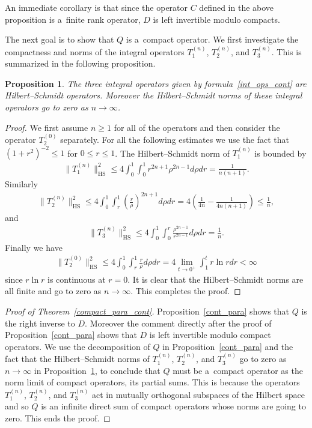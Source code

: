 \documentclass[pdftex]{sigma}
\numberwithin{equation}{section}
\newtheorem{prop}[theo]{Proposition}
{\theoremstyle{definition}
\newtheorem{rem}[theo]{Remark}
\newtheorem{defin}[theo]{Definition}
}
\begin{document}
An immediate corollary is that since the operator $C$ def\/ined in the above proposition is a~f\/inite rank operator, $D$ is
left invertible modulo compacts.

The next goal is to show that $Q$ is a~compact operator.
We f\/irst investigate the compactness and norms of the integral operators $T_1^{(n)}$, $T_2^{(n)}$, and $T_3^{(n)}$.
This is summarized in the following proposition.

\begin{prop}
\label{hs_norm_cont_T}
The three integral operators given by formula~\eqref{int_ops_cont} are Hilbert--Schmidt ope\-rators.
Moreover the Hilbert--Schmidt norms of these integral operators go to zero as $n\to\infty$.
\end{prop}

\begin{proof}
We f\/irst assume $n\ge1$ for all of the operators and then consider the operator $T_2^{(0)}$ separately.
For all the following estimates we use the fact that $(1+r^2)^{-2} \le 1$ for $0\le r\le 1$.
The Hilbert--Schmidt norm of $T_1^{(n)}$ is bounded by
\begin{gather*}
\|T_1^{(n)}\|_{\textrm{HS}}^2 \le 4\int_0^1\int_0^1r^{2n+1}\rho^{2n-1}d\rho dr =\frac{1}{n(n+1)}.
\end{gather*}
Similarly
\begin{gather*}
\|T_2^{(n)}\|_{\textrm{HS}}^2 \le 4\int_0^1\int_r^1 \left(\frac{r}{\rho}\right)^{2n+1}d\rho dr=4\left(\frac{1}{4n}-
\frac{1}{4n(n+1)}\right) \le \frac{1}{n},
\end{gather*}
and
\begin{gather*}
\|T_3^{(n)}\|_{\textrm{HS}}^2 \le 4\int_0^1\int_0^r \frac{\rho^{2n-1}}{r^{2n-1}}d\rho dr = \frac{1}{n}.
\end{gather*}
Finally we have
\begin{gather*}
\big\|T_2^{(0)}\big\|_{\textrm{HS}}^2 \le 4 \int_0^1 \int_r^1 \frac{r}{\rho}d\rho dr = 4\lim_{t\to0^+}\int_1^t r\ln r dr
<\infty
\end{gather*}
since $r\ln r$ is continuous at $r=0$.
It is clear that the Hilbert--Schmidt norms are all f\/inite and go to zero as $n\to\infty$.
This completes the proof.
\end{proof}

\begin{proof}[Proof of Theorem~\ref{compact_para_cont}] Proposition~\ref{cont_para} shows that $Q$ is the right inverse to $D$.
Moreover the comment directly after the proof of Proposition~\ref{cont_para} shows that $D$ is left invertible modulo
compact operators.
We use the decomposition of $Q$ in Proposition~\ref{cont_para} and the fact that the Hilbert--Schmidt norms of
$T_1^{(n)}$, $T_2^{(n)}$, and $T_3^{(n)}$ go to zero as $n\to\infty$ in Proposition~\ref{hs_norm_cont_T}, to conclude
that $Q$ must be a~compact operator as the norm limit of compact operators, its partial sums.
This is because the operators $T_1^{(n)}$, $T_2^{(n)}$, and $T_3^{(n)}$ act in mutually orthogonal subspaces of the
Hilbert space and so $Q$ is an inf\/inite direct sum of compact operators whose norms are going to zero.
This ends the proof.
\end{proof}
\end{document}
